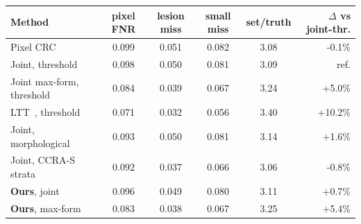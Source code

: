 \begin{tabular}{lccccr}
\toprule
Method & pixel FNR & lesion miss & small miss & set/truth & $\Delta$ vs joint-thr. \\
\midrule
Pixel CRC~\cite{angelopoulos2024crc} & 0.099 & 0.051 & 0.082 & 3.08 & -0.1\% \\
Joint, threshold & 0.098 & 0.050 & 0.081 & 3.09 & ref. \\
Joint max-form, threshold & 0.084 & 0.039 & 0.067 & 3.24 & +5.0\% \\
LTT~\cite{angelopoulos2021ltt}, threshold & 0.071 & 0.032 & 0.056 & 3.40 & +10.2\% \\
Joint, morphological~\cite{mossina2025morph} & 0.093 & 0.050 & 0.081 & 3.14 & +1.6\% \\
Joint, CCRA-S strata~\cite{luo2025ccra} & 0.092 & 0.037 & 0.066 & 3.06 & -0.8\% \\
\textbf{Ours}, joint & 0.096 & 0.049 & 0.080 & 3.11 & +0.7\% \\
\textbf{Ours}, max-form & 0.083 & 0.038 & 0.067 & 3.25 & +5.4\% \\
\bottomrule
\end{tabular}